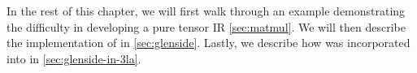 
In the rest of this chapter,
  we will first walk through an example
  demonstrating the difficulty
  in developing a pure tensor IR
  \cref{sec:matmul}.
We will then describe  
  the implementation of \g in
  \cref{sec:glenside}.
Lastly, we describe how \g
  was incorporated into \TLA
  in \cref{sec:glenside-in-3la}.
